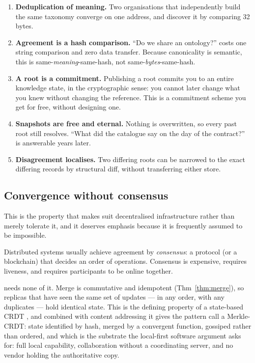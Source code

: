 \begin{enumerate}[leftmargin=1.7em]
\item \textbf{Deduplication of meaning.} Two organisations that independently
  build the same taxonomy converge on one address, and discover it by
  comparing 32 bytes.
\item \textbf{Agreement is a hash comparison.} ``Do we share an ontology?''
  costs one string comparison and zero data transfer. Because canonicality is
  semantic, this is same-\emph{meaning}-same-hash, not
  same-\emph{bytes}-same-hash.
\item \textbf{A root is a commitment.} Publishing a root commits you to an
  entire knowledge state, in the cryptographic sense: you cannot later change
  what you knew without changing the reference. This is a commitment scheme
  you get for free, without designing one.
\item \textbf{Snapshots are free and eternal.} Nothing is overwritten, so
  every past root still resolves. ``What did the catalogue say on the day of
  the contract?'' is answerable years later.
\item \textbf{Disagreement localises.} Two differing roots can be narrowed to
  the exact differing records by structural diff, without transferring either
  store.
\end{enumerate}

\subsection{Convergence without consensus}

This is the property that makes \odag{} suit decentralised infrastructure
rather than merely tolerate it, and it deserves emphasis because it is
frequently assumed to be impossible.

Distributed systems usually achieve agreement by \emph{consensus}: a protocol
(or a blockchain) that decides an order of operations. Consensus is expensive,
requires liveness, and requires participants to be online together.

\odag{} needs none of it. Merge is commutative and idempotent
(Thm~\ref{thm:merge}), so replicas that have seen the same set of updates ---
in any order, with any duplicates --- hold identical state. This is the
defining property of a state-based CRDT \citep{shapiro2011}, and combined with
content addressing it gives the pattern \citet{sanjuan2020} call a
Merkle-CRDT: state identified by hash, merged by a convergent function,
gossiped rather than ordered, and which is the substrate the local-first
software argument \citep{kleppmann2019} asks for: full local capability,
collaboration without a coordinating server, and no vendor holding the
authoritative copy.

